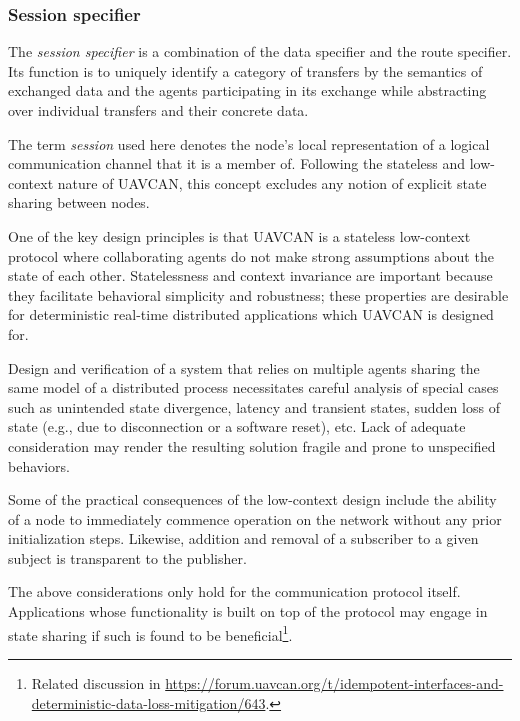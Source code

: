 \subsubsection{Session specifier}\label{sec:transport_session_specifier}

The \emph{session specifier} is a combination of the data specifier and the route specifier.
Its function is to uniquely identify a category of transfers by the semantics of exchanged data and
the agents participating in its exchange while abstracting over individual transfers and their concrete data.

The term \emph{session} used here denotes the node's local representation of a logical communication
channel that it is a member of.
Following the stateless and low-context nature of UAVCAN, this concept excludes any notion of explicit state sharing
between nodes.

\begin{remark}
    One of the key design principles is that UAVCAN is a stateless low-context protocol where collaborating agents
    do not make strong assumptions about the state of each other.
    Statelessness and context invariance are important because they facilitate behavioral simplicity and robustness;
    these properties are desirable for deterministic real-time distributed applications which UAVCAN is designed for.

    Design and verification of a system that relies on multiple agents sharing the same model of a distributed process
    necessitates careful analysis of special cases such as unintended state divergence, latency and transient states,
    sudden loss of state (e.g., due to disconnection or a software reset), etc.
    Lack of adequate consideration may render the resulting solution fragile and prone to unspecified behaviors.

    Some of the practical consequences of the low-context design include the ability of a node to immediately
    commence operation on the network without any prior initialization steps.
    Likewise, addition and removal of a subscriber to a given subject is transparent to the publisher.

    The above considerations only hold for the communication protocol itself.
    Applications whose functionality is built on top of the protocol may engage in state sharing if such is
    found to be beneficial\footnote{%
        Related discussion in
        \url{https://forum.uavcan.org/t/idempotent-interfaces-and-deterministic-data-loss-mitigation/643}.
    }.
\end{remark}


